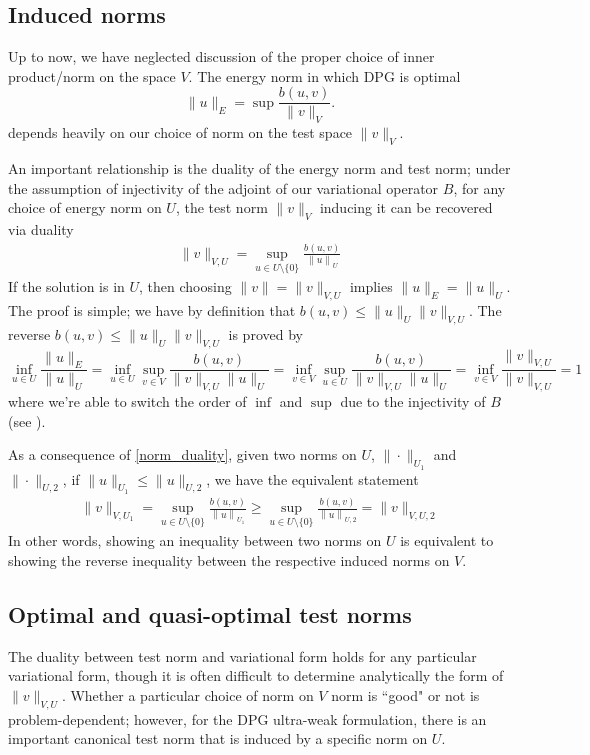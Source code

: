 \documentclass[11pt,onecolumn]{scrartcl}
\begin{document}
\subsection{Induced norms}

Up to now, we have neglected discussion of the proper choice of inner product/norm on the space $V$.  The energy norm in which DPG is optimal 
\[
\|u\|_E = \sup \frac{b(u,v)}{\|v\|_V}.
\]
depends heavily on our choice of norm on the test space $\|v\|_V$. 

An important relationship is the duality of the energy norm and test norm; under the assumption of injectivity of the adjoint of our variational 	operator $B$, for any choice of energy norm on $U$, the test norm $\|v\|_V$ inducing it can be recovered via duality
\begin{align}
\| v \|_{V,U} = \sup_{u \in U\setminus \{0\}} \frac{b\left(u,v\right)}{\left\| u \right\|_U} \label{norm_duality}
\end{align}
If the solution is in $U$, then choosing $\|v\|=\|v\|_{V,U}$ implies $\|u\|_E = \|u\|_U$. The proof is simple; we have by definition that $b(u,v) \leq \|u\|_U\|v\|_{V,U}$. The reverse $b(u,v) \leq \|u\|_U\|v\|_{V,U}$ is proved by
\[
\inf_{u\in U} \frac{\|u\|_E}{\|u\|_U} = \inf_{u\in U} \sup_{v\in V}\frac{b(u,v)}{\|v\|_{V,U}\|u\|_U} = \inf_{v\in V} \sup_{u\in U}\frac{b(u,v)}{\|v\|_{V,U}\|u\|_U} = \inf_{v\in V} \frac{\|v\|_{V,U}}{\|v\|_{V,U}} = 1
\]
where we're able to switch the order of $\inf$ and $\sup$ due to the injectivity of $B$ (see  \cite{BabuskaEquivBrezzi}). 

As a consequence of \eqref{norm_duality}, given two norms on $U$, $\|\cdot\|_{U_1}$ and $\|\cdot\|_{U,2}$, if $\|u\|_{U_1} \leq \|u\|_{U,2}$, we have the equivalent statement
\begin{align*}
\| v \|_{V,U_1} = \sup_{u \in U\setminus \{0\}} \frac{b\left(u,v\right)}{\left\| u \right\|_{U_1}} \geq  \sup_{u \in U\setminus \{0\}} \frac{b\left(u,v\right)}{\left\| u \right\|_{U,2}} = \| v \|_{V,U,2} 
\end{align*}
In other words, showing an inequality between two norms on $U$ is equivalent to showing the reverse inequality between the respective induced norms on $V$.  

\subsection{Optimal and quasi-optimal test norms}

The duality between test norm and variational form holds for any particular variational form, though it is often difficult to determine analytically the form of $\|v\|_{V,U}$.  Whether a particular choice of norm on $V$ norm is ``good" or not is problem-dependent; however, for the DPG ultra-weak formulation, there is an important canonical test norm that is induced by a specific norm on $U$.  
\end{document}
